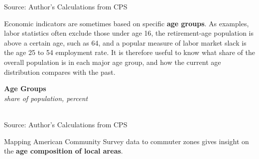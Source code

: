 \documentclass{report}
\newcommand{\tbllink}[1]{\href{https://raw.githubusercontent.com/bdecon/US-chartbook/master/chartbook/data/#1}{\faTable}}
\newcommand{\barylab}[2]{yticklabel style={text width=#1, align=right, 
		style={black!70}, text height=#2},}
\newcommand{\bbar}[2]{extra #1 ticks = {{#2}}, extra #1 tick labels = ,
		extra #1 tick style = {grid=major, grid style={thick, black!25}},}
\newcommand{\barplotnogrid}{xbar=0pt, axis line style={draw=none},
	    yticklabel style={align=left, anchor=east},
      		xmajorticks=false, ymajorgrids=false,   
	    ytick=data, tickwidth=0pt, area legend, reverse legend,
	    nodes near coords align={horizontal},}
\begin{document}
{\begin{minipage}{0.76\textwidth}
\begin{minipage}{0.53\textwidth}
\footnotesize{Source: Author's Calculations from CPS} \hfill \tbllink{median_age.csv}
\end{minipage}
\vspace{3mm}

\small Economic indicators are sometimes based on specific \textbf{age groups}. As examples, labor statistics often exclude those under age 16, the retirement-age population is above a certain age, such as 64, and a popular measure of labor market slack is the age 25 to 54 employment rate. It is therefore useful to know what share of the overall population is in each major age group, and how the current age distribution compares with the past. 
\end{minipage}
\vspace{0.5mm}

\begin{minipage}{0.35\textwidth}
\normalsize \textbf{Age Groups}\\
\footnotesize{\textit{share of population, percent}}\\
\hspace*{-4mm} \\
\footnotesize{Source: Author's Calculations from CPS}
\end{minipage} \hspace{4.5mm}
\begin{minipage}{0.37\textwidth}
\small 
\end{minipage}
\newpage
\begin{minipage}{0.76\textwidth} 
\small Mapping American Community Survey data to commuter zones gives insight on the \textbf{age composition of local areas}.  


\end{minipage}}
\end{document}
